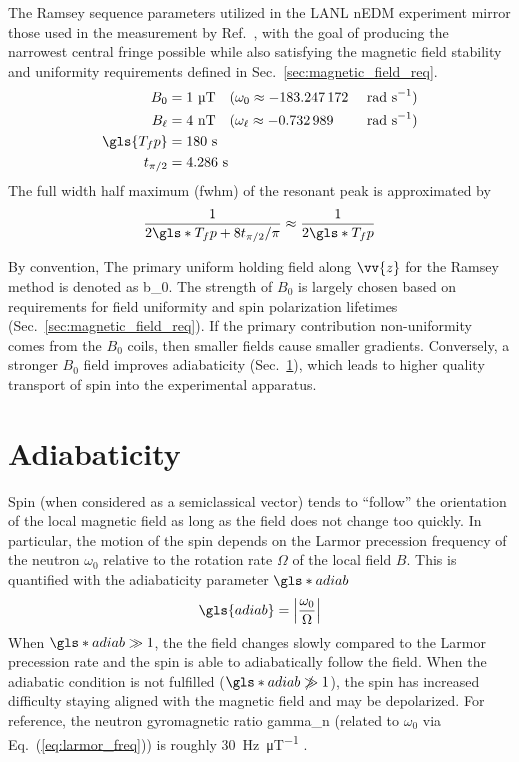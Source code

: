 The Ramsey sequence parameters utilized in the LANL nEDM experiment mirror those used in the measurement by Ref.~\cite{ABE20}, with the goal of producing the narrowest central fringe possible while also satisfying the magnetic field stability and uniformity requirements defined in Sec.~\ref{sec:magnetic_field_req}.
%
\begin{alignat}{3}
    B_0 &= 1\text{ \textmu T} \quad (\omega_0 \approx -183.247\,172 &&\text{ rad s}^{-1} ) \\
    B_\ell &= 4 \text{ nT} \quad (\omega_\ell \approx -0.732\,989 &&\text{ rad s}^{-1} ) \\
    \gls{T_fp} &= 180\text{ s} \\
    t_{\pi/2} &= 4.286\text{ s}
\end{alignat}
%
The full width half maximum (\acrshort*{fwhm}) of the resonant peak is approximated by~\cite{may_thesis, pendlebury_revised_2015}
%
\begin{gather}
    \frac{1}{2 \gls*{T_fp}+8 t_{\pi/2} / \pi} \approx \frac{1}{2\gls*{T_fp}}
\end{gather}

By convention, The primary uniform holding field along $\vv{z}$ for the Ramsey method is denoted as \gls*{b_0}. The strength of  $B_0$ is largely chosen based on requirements for field uniformity and spin polarization lifetimes (Sec.~\ref{sec:magnetic_field_req}). If the primary contribution non-uniformity comes from the $B_0$ coils, then smaller fields cause smaller gradients. Conversely, a stronger $B_0$ field improves adiabaticity (Sec.~\ref{sec:adiabaticity}), which leads to higher quality transport of \ucn spin into the experimental apparatus.


\section{Adiabaticity}\label{sec:adiabaticity}


Spin (when considered as a semiclassical vector) tends to ``follow'' the orientation of the local magnetic field as long as the field does not change too quickly. In particular, the motion of the spin depends on the Larmor precession frequency of the neutron $\omega_0$ relative to the rotation rate $\Omega$ of the local field $B$. This is quantified with the adiabaticity parameter $\gls*{adiab}$ \cite{abragam1961principles}
%
\begin{gather}
    \gls{adiab}=\left| \frac{\omega_0}{\Omega} \right| \label{eq:adiab}
\end{gather}
%
When $\gls*{adiab}\gg 1$, the the field changes slowly compared to the Larmor precession rate and the spin is able to adiabatically follow the field. When the adiabatic condition is not fulfilled ($\gls*{adiab}\not\gg 1$), the spin has increased difficulty staying aligned with the magnetic field and may be depolarized. For reference, the neutron gyromagnetic ratio \gls{gamma_n} (related to $\omega_0$ via Eq.~(\ref{eq:larmor_freq})) is roughly \qty{30}{\hertz.\micro\tesla^{-1}} \cite{codata_2018}.

